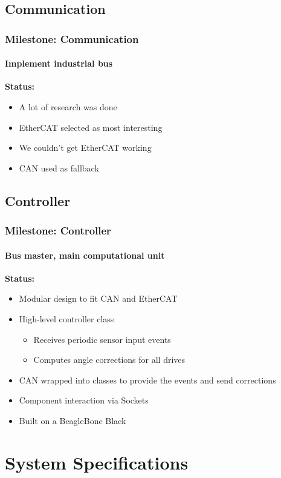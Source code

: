 \documentclass{beamer}
\begin{document}
\subsection{Communication}
\begin{frame}
  \frametitle{Milestone: Communication}
  \framesubtitle{Implement industrial bus}
  \textbf{Status:}
  \begin{itemize}
    \item A lot of research was done
    \item EtherCAT selected as most interesting
    \item We couldn't get EtherCAT working
    \item CAN used as fallback
  \end{itemize}
\end{frame}

\subsection{Controller}
\begin{frame}
  \frametitle{Milestone: Controller}
  \framesubtitle{Bus master, main computational unit}
  \textbf{Status:}
  \begin{itemize}
    \item Modular design to fit CAN and EtherCAT
    \item High-level controller class
      \begin{itemize}
        \item Receives periodic sensor input events
        \item Computes angle corrections for all drives
      \end{itemize}
    \item CAN wrapped into classes to provide the events and send corrections
    \item Component interaction via Sockets
    \item Built on a BeagleBone Black
  \end{itemize}
\end{frame}


\section{System Specifications}
\end{document}
